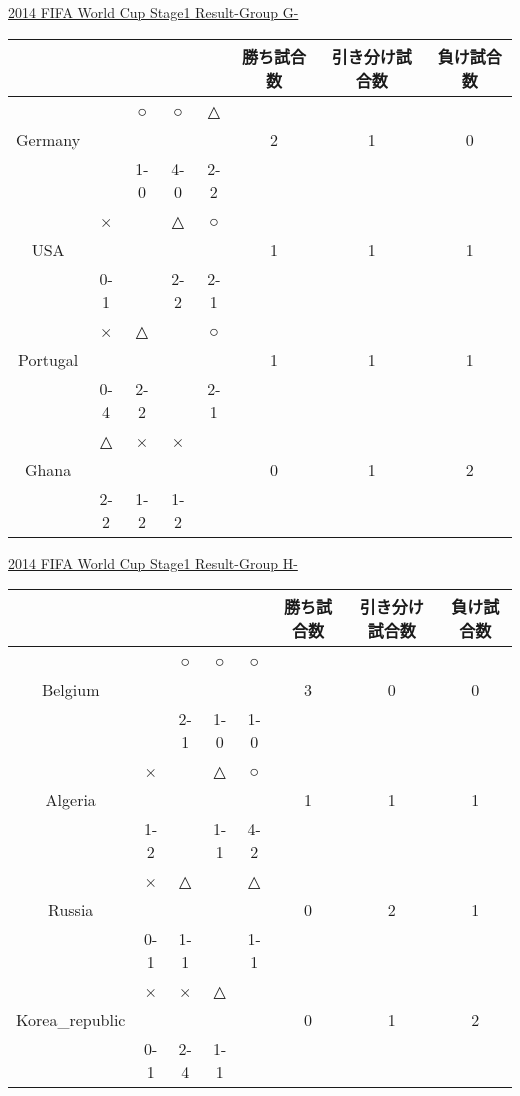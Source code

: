\documentclass[a4j] {jarticle}
\begin{document}
		\newpage
		\begin{table}[htb]
		\begin{center}
		\underline{2014 FIFA World Cup Stage1 Result-Group G-}
		\begin{tabular}{|c|c|c|c|c|c|c|c|}
		\hline
		\multicolumn{1}{|c|}{} &
		\multicolumn{1}{c|}{} &
		\multicolumn{1}{c|}{} &
		\multicolumn{1}{c|}{} &
		\multicolumn{1}{c|}{} &
		\multicolumn{1}{c|}{勝ち試合数} &
		\multicolumn{1}{c|}{引き分け試合数} &
		\multicolumn{1}{c|}{負け試合数} \\
		\hline
 &  & ○ & ○ & △ & & & \\ 
Germany & & & & & 2 & 1 & 0 \\ 
 & & 1-0 & 4-0 & 2-2 &  & & \\ 
 \hline
 & × &  & △ & ○ & & & \\ 
USA & & & & & 1 & 1 & 1 \\ 
 &0-1 &  & 2-2 & 2-1 &  & & \\ 
 \hline
 & × & △ &  & ○ & & & \\ 
Portugal & & & & & 1 & 1 & 1 \\ 
 &0-4 & 2-2 &  & 2-1 &  & & \\ 
 \hline
 & △ & × & × &  & & & \\ 
Ghana & & & & & 0 & 1 & 2 \\ 
 &2-2 & 1-2 & 1-2 &  &  & & \\ 
 \hline
		\end{tabular}
		\end{center}
		\end{table}
		\newpage
		\begin{table}[htb]
		\begin{center}
		\underline{2014 FIFA World Cup Stage1 Result-Group H-}
		\begin{tabular}{|c|c|c|c|c|c|c|c|}
		\hline
		\multicolumn{1}{|c|}{} &
		\multicolumn{1}{c|}{} &
		\multicolumn{1}{c|}{} &
		\multicolumn{1}{c|}{} &
		\multicolumn{1}{c|}{} &
		\multicolumn{1}{c|}{勝ち試合数} &
		\multicolumn{1}{c|}{引き分け試合数} &
		\multicolumn{1}{c|}{負け試合数} \\
		\hline
 &  & ○ & ○ & ○ & & & \\ 
Belgium & & & & & 3 & 0 & 0 \\ 
 & & 2-1 & 1-0 & 1-0 &  & & \\ 
 \hline
 & × &  & △ & ○ & & & \\ 
Algeria & & & & & 1 & 1 & 1 \\ 
 &1-2 &  & 1-1 & 4-2 &  & & \\ 
 \hline
 & × & △ &  & △ & & & \\ 
Russia & & & & & 0 & 2 & 1 \\ 
 &0-1 & 1-1 &  & 1-1 &  & & \\ 
 \hline
 & × & × & △ &  & & & \\ 
Korea\_republic & & & & & 0 & 1 & 2 \\ 
 &0-1 & 2-4 & 1-1 &  &  & & \\ 
 \hline
		\end{tabular}
		\end{center}
		\end{table}
		\newpage
\end{document}

